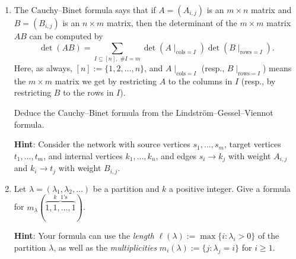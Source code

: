 \documentclass[11pt]{article}
\begin{document}
\begin{enumerate}
\item The Cauchy--Binet formula says that if $A=(A_{i,j})$ is an $m \times n$ matrix and $B=(B_{i,j})$ is an $n\times m$ matrix, then the determinant of the $m \times m$ matrix $AB$ can be computed by
\[ \det(AB) = \sum_{I \subseteq [n], \; \#I = m} \det(A\mid_{\mathrm{cols}=I})  \det(B\mid_{\mathrm{rows}=I}). \]
Here, as always, $[n] := \{1,2,\ldots,n\}$, and $A\mid_{\mathrm{cols}=I}$ (resp., $B\mid_{\mathrm{rows}=I}$) means the $m\times m$ matrix we get by restricting $A$ to the columns in $I$ (resp., by restricting $B$ to the rows in $I$).

Deduce the Cauchy--Binet formula from the Lindstr\"{o}m--Gessel--Viennot formula.

{\bf Hint}: Consider the network with source vertices $s_1,\ldots,s_m$, target vertices $t_1,\ldots,t_m$, and internal vertices $k_1,\ldots, k_n$, and edges $s_i \to k_j$ with weight $A_{i,j}$ and $k_i \to t_j$ with weight $B_{i,j}$.

\item Let $\lambda=(\lambda_1,\lambda_2,\ldots)$ be a partition and $k$ a positive integer. Give a formula for $m_{\lambda}(\overbrace{1,1,\ldots,1}^{\textrm{$k$ $1$'s}})$.

{\bf Hint}: Your formula can use the \emph{length} $\ell(\lambda) := \max \{ i\colon \lambda_i > 0 \}$ of the partition $\lambda$, as well as the \emph{multiplicities} $m_i(\lambda) := \{j\colon \lambda_j = i\}$ for $i \geq 1$.

\end{enumerate}
\end{document}
